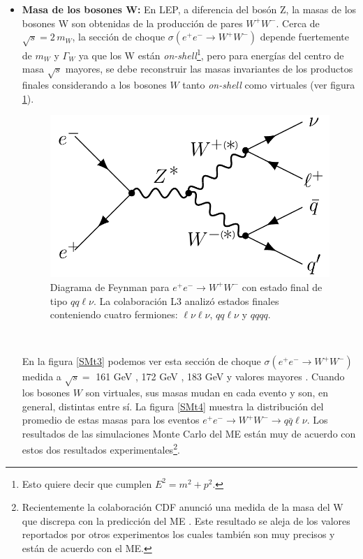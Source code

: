 \begin{itemize}
	
\newpage	
	
\item \textbf{Masa de los bosones W:} En LEP, a diferencia del bosón Z, la masas de los bosones W son obtenidas de la producción de pares $W^+W^-$. Cerca de $\sqrt{s}=2\,m_W$, la sección de choque $\sigma (e^+e^- \to W^+W^-)$ depende fuertemente de $m_W$ y $\Gamma_W$ ya que los W están \textit{on-shell}\footnote{Esto quiere decir que cumplen $E^2=m^2+p^2$.}, pero para energías del centro de masa $\sqrt{s}$ mayores, se debe reconstruir las masas invariantes de los productos finales considerando a los bosones $W$ tanto \textit{on-shell} como virtuales (ver figura \ref{eeWW}).
\begin{figure}[h]
\centering
\includegraphics[scale=0.45]{Images/ee_to_WW.pdf}
\caption[Diagrama de Feynman para $e^+e^- \to W^+W^-$ con estado final $qq\ell \nu$]{Diagrama de Feynman para $e^+e^- \to W^+W^-$ con estado final de tipo $qq\ell \nu$. La colaboración L3 analizó estados finales conteniendo cuatro fermiones: $\ell \nu\ell \nu$, $qq\ell \nu$ y $qqqq$.}
\label{eeWW}
\end{figure}



\  \

En la figura \ref{SMt3} podemos ver esta sección de choque $\sigma (e^+e^- \to W^+W^-)$ medida a $\sqrt{s}=$ 161 GeV \cite{acciarri1997pair}, 172 GeV \cite{acciarri1997measurement}, 183 GeV \cite{acciarri1998measurement} y valores mayores \cite{achard2004measurement}. Cuando los bosones $W$ son virtuales, sus masas mudan en cada evento y son, en general, distintas entre sí. La figura \ref{SMt4} muestra la distribución del promedio de estas masas para los eventos $e^+e^- \to W^{+}W^{-}\to q\bar{q}\ell \nu$. Los resultados de las simulaciones Monte Carlo del ME están muy de acuerdo con estos dos resultados experimentales\footnote{Recientemente la colaboración CDF anunció una medida de la masa del W que discrepa con la predicción del ME \cite{cdf2022high}. Este resultado se aleja de los valores reportados por otros experimentos los cuales también son muy precisos y están de acuerdo con el ME.}. 
\end{itemize}


